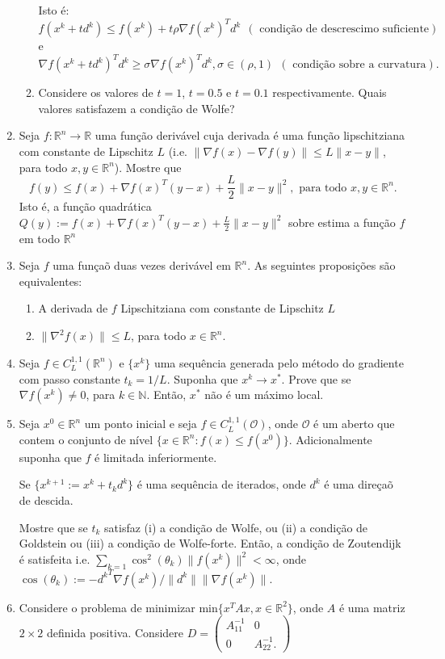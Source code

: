\documentclass[a4paper,latin]{article}
\begin{document}
\begin{enumerate}
\begin{enumerate}
     Isto é:
     $$f(x^{k}+td^{k})\leq f(x^k)+t\rho\nabla f(x^{k})^{T}d^{k}
      \ \  (\text{ condição de descrescimo suficiente})$$ 
     e
      $$\nabla f(x^{k}+td^{k})^{T}d^{k}\geq 
      \sigma \nabla f(x^k)^{T}d^{k}, \sigma \in (\rho,1) \ \ 
      (\text{ condição sobre a curvatura}). $$
     \item Considere os valores de $t=1$, $t=0.5$ e $t=0.1$ respectivamente. Quais valores satisfazem a condição de Wolfe?
     \end{enumerate}            
    \item Seja $f:\mathbb{R}^{n}\rightarrow \mathbb{R}$ uma função derivável cuja derivada é uma função lipschitziana com constante de Lipschitz $L$ 
    (i.e. $\|\nabla f(x)-\nabla f(y)\|\leq L\|x-y\|$, para todo $x,y \in \mathbb{R}^{n}$).
    Mostre que
    $$ f(y)\leq f(x)+\nabla f(x)^{T}(y-x)+\frac{L}{2}\|x-y\|^{2}, \text{ para todo }x, y \in \mathbb{R}^{n}.$$    
    Isto é, a função quadrática 
    $Q(y):=f(x)+\nabla f(x)^{T}(y-x)+\frac{L}{2}\|x-y\|^{2}$
    sobre estima a função $f$ em todo $\mathbb{R}^{n}$     
    \item 
    Seja $f$ uma funçaõ duas vezes derivável em $\mathbb{R}^{n}$.
    As seguintes proposições são equivalentes:
      \begin{enumerate}
      \item  A derivada 
      de $f$ Lipschitziana 
      com constante de Lipschitz $L$
      \item $\|\nabla^{2} f(x)\|\leq L$,    para todo $x \in \mathbb{R}^{n}$.
      \end{enumerate} 
    \item 
    Seja $f \in C^{1,1}_{L}(\mathbb{R}^{n})$ e $\{x^{k}\}$ uma sequência generada pelo método do gradiente com passo constante $t_{k}=1/L$.
    Suponha que $x^{k}\rightarrow x^{*}$.
    Prove que se $\nabla f(x^{k})\neq 0$, para $k \in \mathbb{N}$. Então, $x^*$ não é um
    máximo local.  
    \item Seja $x^{0} \in \mathbb{R}^{n}$ um ponto inicial e seja $f \in C^{1,1}_{L}(\mathcal{O})$, onde 
    $\mathcal{O}$ é um aberto que contem o conjunto de nível 
   $ \{x \in \mathbb{R}^{n}: f(x)\leq f(x^0)\}$. Adicionalmente suponha que $f$ é limitada inferiormente.
    
    Se $\{x^{k+1}:=x^{k}+t_{k}d^{k}\}$
    é uma sequência de iterados, onde 
    $d^{k}$ é uma direçaõ de descida.
    
    Mostre que se  
    $t_{k}$ satisfaz (i) a condição de Wolfe, ou (ii) a condição de Goldstein ou (iii) a condição de Wolfe-forte. Então, a condição de Zoutendijk
     é satisfeita i.e. 
     $\sum_{k=1} \cos^{2}(\theta_{k})\|f(x^{k})\|^{2}< \infty$, 
     onde 
     $\cos(\theta_{k}):=-{d^{k}}^{T}\nabla f(x^k)/\|d^k\|\|\nabla f(x^k)\|$. 
    \item Considere o problema de minimizar 
    $\text{min} 
    \{x^{T}Ax, x \in \mathbb{R}^2\}$, 
    onde $A$ é uma matriz $2\times 2$ definida positiva. 
    Considere 
    $D=\begin{pmatrix}
      A_{11}^{-1} & 0 \\
      0   & A_{22}^{-1}.
      \end{pmatrix}$
    

\end{enumerate}
\end{document}
